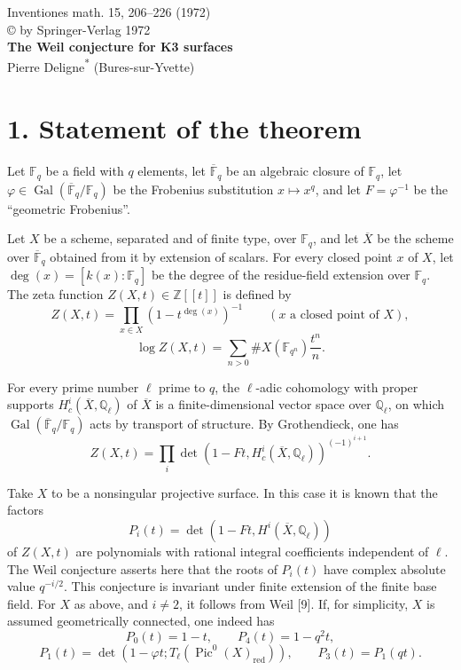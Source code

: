 \documentclass[10pt]{article}
\newcommand{\F}{\mathbb{F}}
\newcommand{\Z}{\mathbb{Z}}
\newcommand{\Ql}{\mathbb{Q}_\ell}
\newcommand{\Fp}{\mathbb{F}_q}
\newcommand{\Gal}{\operatorname{Gal}}
\newcommand{\Pic}{\operatorname{Pic}}
\begin{document}
\begin{center}
{\large Inventiones math. 15, 206--226 (1972)}\\
{\small \copyright{} by Springer-Verlag 1972}\\[3.0em]
{\Large\bfseries The Weil conjecture for K3 surfaces}\\[1.5em]
{Pierre Deligne\textsuperscript{*} (Bures-sur-Yvette)}
\end{center}

\section*{1. Statement of the theorem}

Let $\Fp$ be a field with $q$ elements, let $\overline{\F}_q$ be an algebraic closure of $\Fp$, let $\varphi\in\Gal(\overline{\F}_q/\Fp)$ be the Frobenius substitution $x\mapsto x^q$, and let $F=\varphi^{-1}$ be the ``geometric Frobenius''.

Let $X$ be a scheme, separated and of finite type, over $\Fp$, and let $\overline X$ be the scheme over $\overline{\F}_q$ obtained from it by extension of scalars. For every closed point $x$ of $X$, let $\deg(x)=[k(x):\Fp]$ be the degree of the residue-field extension over $\Fp$. The zeta function $Z(X,t)\in\Z[[t]]$ is defined by
\[
Z(X,t)=\prod_{x\in X}(1-t^{\deg(x)})^{-1}\qquad(x\text{ a closed point of }X),
\]
\[
\log Z(X,t)=\sum_{n>0}\#X(\F_{q^n})\frac{t^n}{n}.
\]

For every prime number $\ell$ prime to $q$, the $\ell$-adic cohomology with proper supports $H_c^i(\overline X,\Ql)$ of $\overline X$ is a finite-dimensional vector space over $\Ql$, on which $\Gal(\overline{\F}_q/\Fp)$ acts by transport of structure. By Grothendieck, one has
\[
Z(X,t)=\prod_i\det(1-Ft,H_c^i(\overline X,\Ql))^{(-1)^{i+1}}.
\]

Take $X$ to be a nonsingular projective surface. In this case it is known that the factors
\[
P_i(t)=\det(1-Ft,H^i(\overline X,\Ql))
\]
of $Z(X,t)$ are polynomials with rational integral coefficients independent of $\ell$. The Weil conjecture asserts here that the roots of $P_i(t)$ have complex absolute value $q^{-i/2}$. This conjecture is invariant under finite extension of the finite base field. For $X$ as above, and $i\ne2$, it follows from Weil [9]. If, for simplicity, $X$ is assumed geometrically connected, one indeed has
\[
P_0(t)=1-t,
\qquad
P_4(t)=1-q^2t,
\]
\[
P_1(t)=\det(1-\varphi t;T_\ell(\Pic^0(X)_{\mathrm{red}})),
\qquad
P_3(t)=P_1(qt).
\]
\end{document}
